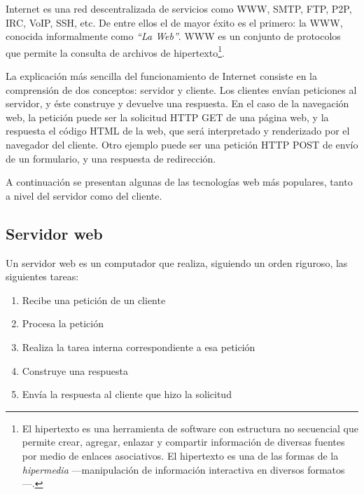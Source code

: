 \addtocounter{footnote}{1}\footnotetext{\label{foot-brainarena}{\tt http://www.brainarena.com}}


Internet es una red descentralizada de servicios como \acs{WWW}, \acs{SMTP}, \acs{FTP}, \acs{P2P}, \acs{IRC}, \acs{VoIP}, \acs{SSH}, etc. De entre ellos el de mayor éxito es el primero: la \acf{WWW}, conocida informalmente como {\it ``La Web''}. \acs{WWW} es un conjunto de protocolos que permite la consulta de archivos de hipertexto\footnote{El hipertexto es una herramienta de software con estructura no secuencial que permite crear, agregar, enlazar y compartir información de diversas fuentes por medio de enlaces asociativos. El hipertexto es una de las formas de la {\it hipermedia} ---manipulación de información interactiva en diversos formatos---.}.

La explicación más sencilla del funcionamiento de Internet consiste en la comprensión de dos conceptos: servidor y cliente. Los clientes envían peticiones al servidor, y éste construye y devuelve una respuesta. En el caso de la navegación web, la petición puede ser la solicitud \acs{HTTP} \acs{GET} de una página web, y la respuesta el código \acs{HTML} de la web, que será interpretado y renderizado por el navegador del cliente. Otro ejemplo puede ser una petición \acs{HTTP} \acs{POST} de envío de un formulario, y una respuesta de redirección.

A continuación se presentan algunas de las tecnologías web más populares, tanto a nivel del servidor como del cliente.

\subsection{Servidor web}

Un servidor web es un computador que realiza, siguiendo un orden riguroso, las siguientes tareas:

\begin{enumerate}
\item Recibe una petición de un cliente
\item Procesa la petición
\item Realiza la tarea interna correspondiente a esa petición
\item Construye una respuesta
\item Envía la respuesta al cliente que hizo la solicitud
\end{enumerate}

